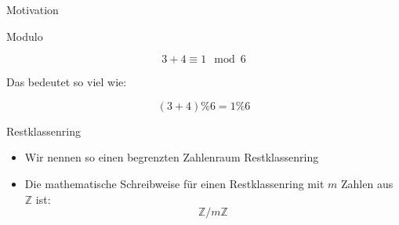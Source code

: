 \begin{frame}[fragile]{Motivation}
    \begin{center}
        \vspace{1cm}

    \end{center}
\end{frame}

\begin{frame}[fragile]{Modulo}
    \begin{center}
        \Large
        $$
            3+4 \equiv 1 \mod 6
        $$

        \pause
        Das bedeutet so viel wie:

        $$
            (3+4)\% 6 = 1 \% 6
        $$
    \end{center}
\end{frame}


\begin{frame}[fragile]{Restklassenring}
    \begin{itemize}
        \item Wir nennen so einen begrenzten Zahlenraum \alert{Restklassenring}
        \item Die mathematische Schreibweise für einen Restklassenring mit $m$ Zahlen aus $\mathbb{Z}$ ist:
              $$
                  \mathbb Z / m\mathbb Z
              $$
    \end{itemize}
\end{frame}

